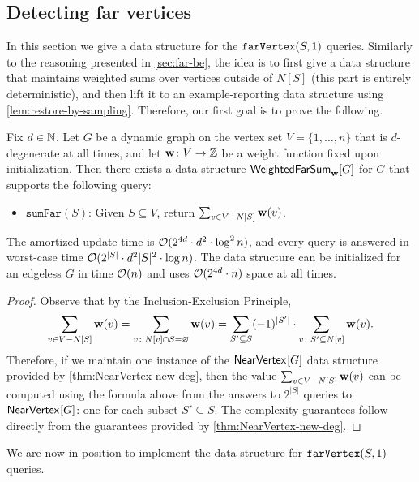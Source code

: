 \subsection{Detecting far vertices}\label{sec:distone-far}

In this section we give a data structure for the $\mathtt{farVertex}(S,1)$ queries. Similarly to the reasoning presented in \cref{sec:far-be}, the idea is to first give a data structure that maintains weighted sums over vertices outside of $N[S]$ (this part is entirely deterministic), and then lift it to an example-reporting data structure using \cref{lem:restore-by-sampling}. Therefore, our first goal is to prove the following.

\newcommand{\WeiFar}{\mathsf{WeightedFarSum}}
\newcommand{\sumFar}{\mathtt{sumFar}}

\begin{lemma}\label{lem:wei-sums-far-deg}
	Fix $d\in \mathbb{N}$.
	Let $G$ be a dynamic graph on the vertex set $V=\{1,\ldots,n\}$ that is $d$-degenerate at all times, and let $\mathbf{w}\colon V\to \mathbb{Z}$ be a weight function fixed upon initialization. Then there exists a data structure $\WeiFar_{\wei}[G]$ for $G$ that supports the following query:
	\begin{itemize}
		\item $\sumFar(S)$: Given $S\subseteq V$, return $\sum_{v\in V- N[S]} \mathbf{w}(v)$.
	\end{itemize}
	The amortized update time is $\mathcal{O}(2^{4d}\cdot d^2\cdot \log^2 n)$, and every query is answered in worst-case time $\mathcal{O}(2^{|S|}\cdot d^2|S|^2\cdot \log n)$. The data structure can be initialized for an edgeless $G$ in time $\mathcal{O}(n)$ and uses $\mathcal{O}(2^{4d}\cdot n)$ space at all times.
\end{lemma}
\begin{proof}
	Observe that by the Inclusion-Exclusion Principle,
	\[\sum_{v\in V- N[S]} \mathbf{w}(v) = \sum_{v\colon N[v]\cap S=\varnothing} \mathbf{w}(v)= \sum_{S'\subseteq S} (-1)^{|S'|}\cdot \sum_{v\colon S'\subseteq N[v]} \mathbf{w}(v).\]
	Therefore, if we maintain one instance of the $\mathsf{NearVertex}_{}[G]$ data structure provided by \cref{thm:NearVertex-new-deg}, then the value $\sum_{v\in V- N[S]} \mathbf{w}(v)$ can be computed using the formula above from the answers to $2^{|S|}$ queries to $\mathsf{NearVertex}_{}[G]$: one for each subset $S'\subseteq S$. The complexity guarantees follow directly from the guarantees provided by \cref{thm:NearVertex-new-deg}.
\end{proof}

We are now in position to implement the data structure for $\mathtt{farVertex}(S,1)$ queries.

